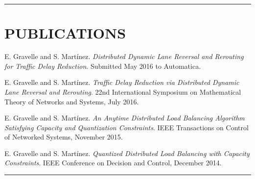 \documentclass{res}
\begin{document}
\begin{resume}
\hspace{-8.5ex}\rule{16.5cm}{0.4pt}
 \vspace*{-3ex}
\section{PUBLICATIONS} 
\vspace{1ex}
E. Gravelle and S. Mart{\'i}nez. \textit{Distributed Dynamic Lane Reversal and Rerouting for Traffic Delay Reduction}. Submitted May 2016 to Automatica.\\

\vspace*{-4ex}

E. Gravelle and S. Mart{\'i}nez. \textit{Traffic Delay Reduction via Distributed Dynamic Lane Reversal and Rerouting}. 22nd International Symposium on Mathematical Theory of Networks and Systems, July 2016.\\

\vspace*{-4ex}

E. Gravelle and S. Mart{\'i}nez. \textit{An Anytime Distributed Load Balancing Algorithm Satisfying Capacity and Quantization Constraints}. IEEE Transactions on Control of Networked Systems, November 2015. \\

\vspace*{-4ex}

E. Gravelle and S. Mart{\'i}nez. \textit{Quantized Distributed Load Balancing with Capacity Constraints}. IEEE Conference on Decision and Control, December 2014. \\

 \vspace*{-6ex}
\hspace{-8.5ex}\rule{16.5cm}{0.4pt}
 \vspace*{-3ex}

%


\end{resume}
\end{document}

